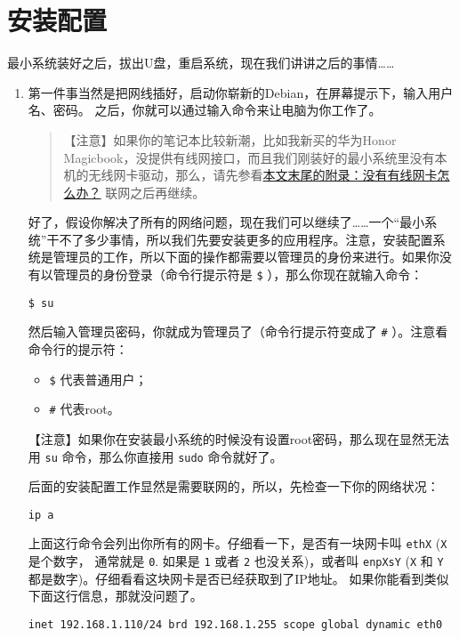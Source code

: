 \documentclass{wx672ctexart}
\begin{document}
\section{安装配置}
\label{sec:orgcfbfe32}
最小系统装好之后，拔出U盘，重启系统，现在我们讲讲之后的事情……
\begin{enumerate}
\item 第一件事当然是把网线插好，启动你崭新的Debian，在屏幕提示下，输入用户名、密码。
之后，你就可以通过输入命令来让电脑为你工作了。

\begin{quote}
【注意】如果你的笔记本比较新潮，比如我新买的华为Honor Magicbook，没提供有线网接口，而且我们刚装好的最小系统里没有本机的无线网卡驱动，那么，请先参看\hyperref[sec:org3378f41]{本文末尾的附录：没有有线网卡怎么办？}
联网之后再继续。
\end{quote}

好了，假设你解决了所有的网络问题，现在我们可以继续了……一个“最小系统”干不了多少事情，所以我们先要安装更多的应用程序。注意，安装配置系统是管理员的工作，所以下面的操作都需要以管理员的身份来进行。如果你没有以管理员的身份登录（命令行提示符是 \texttt{\$} ），那么你现在就输入命令：
\begin{verbatim}
$ su
\end{verbatim}

然后输入管理员密码，你就成为管理员了（命令行提示符变成了 \texttt{\#} ）。注意看命令行的提示符：
\begin{itemize}
\item \texttt{\$} 代表普通用户；
\item \texttt{\#} 代表root。
\end{itemize}

【注意】如果你在安装最小系统的时候没有设置root密码，那么现在显然无法用 \texttt{su} 命令，那么你直接用 \texttt{sudo} 命令就好了。

后面的安装配置工作显然是需要联网的，所以，先检查一下你的网络状况：
\begin{verbatim}
ip a
\end{verbatim}
上面这行命令会列出你所有的网卡。仔细看一下，是否有一块网卡叫 \texttt{ethX} (\texttt{X} 是个数字，
通常就是 \texttt{0}. 如果是 \texttt{1} 或者 \texttt{2} 也没关系)，或者叫 \texttt{enpXsY} (\texttt{X} 和 \texttt{Y} 都是数字)。仔细看看这块网卡是否已经获取到了IP地址。
如果你能看到类似下面这行信息，那就没问题了。
\begin{verbatim}
inet 192.168.1.110/24 brd 192.168.1.255 scope global dynamic eth0
\end{verbatim}


\end{enumerate}
\end{document}
